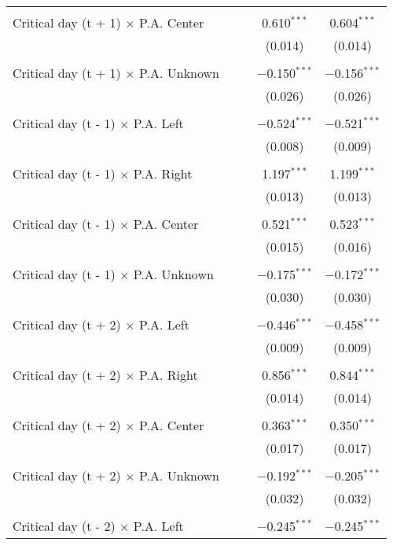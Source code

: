 \documentclass[
]{article}
\begin{document}
\begin{table}[!htbp]
{\begin{tabular}{@{\extracolsep{5pt}}lcccc}
  & & & & \\ 
 Critical day (t + 1) $\times$ P.A. Center &  &  & 0.610$^{***}$ & 0.604$^{***}$ \\ 
  &  &  & (0.014) & (0.014) \\ 
  & & & & \\ 
 Critical day (t + 1) $\times$ P.A. Unknown &  &  & $-$0.150$^{***}$ & $-$0.156$^{***}$ \\ 
  &  &  & (0.026) & (0.026) \\ 
  & & & & \\ 
 Critical day (t - 1) $\times$ P.A. Left &  &  & $-$0.524$^{***}$ & $-$0.521$^{***}$ \\ 
  &  &  & (0.008) & (0.009) \\ 
  & & & & \\ 
 Critical day (t - 1) $\times$ P.A. Right &  &  & 1.197$^{***}$ & 1.199$^{***}$ \\ 
  &  &  & (0.013) & (0.013) \\ 
  & & & & \\ 
 Critical day (t - 1) $\times$ P.A. Center &  &  & 0.521$^{***}$ & 0.523$^{***}$ \\ 
  &  &  & (0.015) & (0.016) \\ 
  & & & & \\ 
 Critical day (t - 1) $\times$ P.A. Unknown &  &  & $-$0.175$^{***}$ & $-$0.172$^{***}$ \\ 
  &  &  & (0.030) & (0.030) \\ 
  & & & & \\ 
 Critical day (t + 2) $\times$ P.A. Left &  &  & $-$0.446$^{***}$ & $-$0.458$^{***}$ \\ 
  &  &  & (0.009) & (0.009) \\ 
  & & & & \\ 
 Critical day (t + 2) $\times$ P.A. Right &  &  & 0.856$^{***}$ & 0.844$^{***}$ \\ 
  &  &  & (0.014) & (0.014) \\ 
  & & & & \\ 
 Critical day (t + 2) $\times$ P.A. Center &  &  & 0.363$^{***}$ & 0.350$^{***}$ \\ 
  &  &  & (0.017) & (0.017) \\ 
  & & & & \\ 
 Critical day (t + 2) $\times$ P.A. Unknown &  &  & $-$0.192$^{***}$ & $-$0.205$^{***}$ \\ 
  &  &  & (0.032) & (0.032) \\ 
  & & & & \\ 
 Critical day (t - 2) $\times$ P.A. Left &  &  & $-$0.245$^{***}$ & $-$0.245$^{***}$ \\ 

\end{tabular}}
\end{table}
\end{document}
